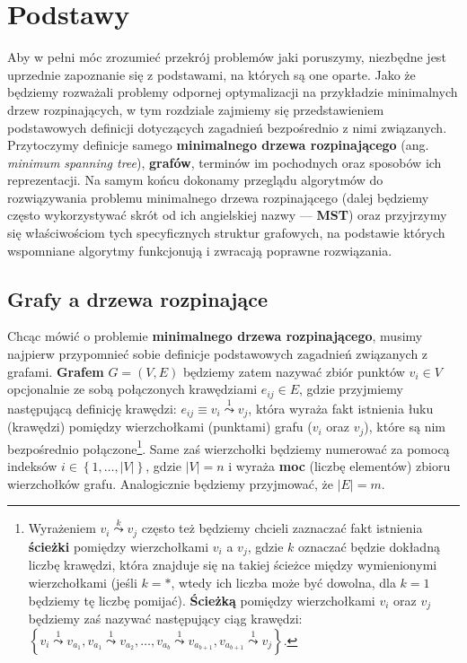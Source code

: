 \chapter{Podstawy}
\thispagestyle{chapterBeginStyle}

Aby w pełni móc zrozumieć przekrój problemów jaki poruszymy, niezbędne jest uprzednie zapoznanie się z podstawami, na których są one oparte. Jako że będziemy rozważali problemy odpornej optymalizacji na przykładzie minimalnych drzew rozpinających, w tym rozdziale zajmiemy się przedstawieniem podstawowych definicji dotyczących zagadnień bezpośrednio z nimi związanych. Przytoczymy definicje samego \textbf{minimalnego drzewa rozpinającego} (ang. \textit{minimum spanning tree}), \textbf{grafów}, terminów im pochodnych oraz sposobów ich reprezentacji. Na samym końcu dokonamy przeglądu algorytmów do rozwiązywania problemu minimalnego drzewa rozpinającego (dalej będziemy często wykorzystywać skrót od ich angielskiej nazwy --- \textbf{MST}) oraz przyjrzymy się właściwościom tych specyficznych struktur grafowych, na podstawie których wspomniane algorytmy funkcjonują i zwracają poprawne rozwiązania.

\section{Grafy a drzewa rozpinające}

Chcąc mówić o problemie \textbf{minimalnego drzewa rozpinającego}, musimy najpierw przypomnieć sobie definicje podstawowych zagadnień związanych z grafami. \textbf{Grafem} $G = \left( V, E \right)$ będziemy zatem nazywać zbiór punktów $v_{i} \in V$ opcjonalnie ze sobą połączonych krawędziami $e_{ij} \in E$, gdzie przyjmiemy następującą definicję krawędzi: $e_{ij} \equiv v_{i} \overset{1}{\leadsto} v_{j}$, która wyraża fakt istnienia łuku (krawędzi) pomiędzy wierzchołkami (punktami) grafu ($v_{i}$ oraz $v_{j}$), które są nim bezpośrednio połączone\footnote{Wyrażeniem $v_{i} \overset{k}{\leadsto} v_{j}$ często też będziemy chcieli zaznaczać fakt istnienia \textbf{ścieżki} pomiędzy wierzchołkami $v_{i}$ a $v_{j}$, gdzie $k$ oznaczać będzie dokładną liczbę krawędzi, która znajduje się na takiej ścieżce między wymienionymi wierzchołkami (jeśli $k = \ast$, wtedy ich liczba może być dowolna, dla $k = 1$ będziemy tę liczbę pomijać). \textbf{Ścieżką} pomiędzy wierzchołkami $v_{i}$ oraz $v_{j}$ będziemy zaś nazywać następujący ciąg krawędzi: $\left\{ v_{i} \overset{1}{\leadsto} v_{a_{1}}, v_{a_{1}} \overset{1}{\leadsto} v_{a_{2}}, \dots, v_{a_{b}} \overset{1}{\leadsto} v_{a_{b+1}}, v_{a_{b+1}} \overset{1}{\leadsto} v_{j}  \right\}$.}. Same zaś wierzchołki będziemy numerować za pomocą indeksów $i \in \left\{ 1, \dots, \left| V \right| \right\}$, gdzie $\left| V \right| = n$ i wyraża \textbf{moc} (liczbę elementów) zbioru wierzchołków grafu. Analogicznie będziemy przyjmować, że $\left| E \right| = m$. 

